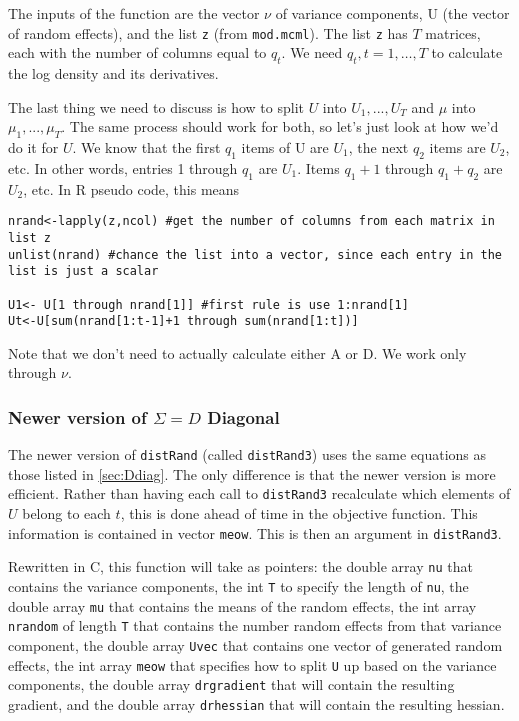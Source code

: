 \documentclass{article}
\begin{document}
The inputs of the function are the vector $\nu$ of variance components, U (the vector of random effects), and the list \texttt{z} (from \texttt{mod.mcml}).  The list \texttt{z} has $T$ matrices, each with the number of columns equal to $q_t$. We need $q_t,t=1,\ldots,T$ to calculate the log density and its derivatives.



The last thing we need to discuss is how to split $U$ into $U_1,...,U_T$ and $\mu$ into $\mu_1,...,\mu_T$. The same process should work for both, so let's just look at how we'd do it for $U$.  We know that the first $q_1$ items of U are $U_1$, the next $q_2$ items are $U_2$, etc.  In other words, entries 1 through $q_1$ are $U_1$. Items $q_1+1$ through $q_1+q_2$ are $U_2$, etc. In R pseudo code, this means 
\begin{verbatim}
nrand<-lapply(z,ncol) #get the number of columns from each matrix in list z
unlist(nrand) #chance the list into a vector, since each entry in the list is just a scalar

U1<- U[1 through nrand[1]] #first rule is use 1:nrand[1]
Ut<-U[sum(nrand[1:t-1]+1 through sum(nrand[1:t])]
\end{verbatim} 

Note that we don't need to actually calculate either A or D. We work only through $\nu$.

\subsubsection{Newer version of $\Sigma=D$ Diagonal}
The newer version of \texttt{distRand} (called \texttt{distRand3}) uses the same equations as those listed in \ref{sec:Ddiag}. The only difference is that the newer version is more efficient. Rather than having each call to \texttt{distRand3} recalculate which elements of $U$ belong to each $t$, this is done ahead of time in the objective function. This information is contained in vector \texttt{meow}. This is then an argument in \texttt{distRand3}.

Rewritten in C, this function will take as pointers: the double array \texttt{nu} that contains the variance components, the int \texttt{T} to specify the length of \texttt{nu}, the double array \texttt{mu} that contains the means of the random effects, the int array \texttt{nrandom} of length \texttt{T} that contains the number random effects from that variance component, the double array \texttt{Uvec} that contains one vector of generated random effects,  the int array \texttt{meow} that specifies how to split \texttt{U} up based on the variance components, the double array \texttt{drgradient} that will contain the resulting gradient, and the double array \texttt{drhessian} that will contain the resulting hessian.
\end{document}
